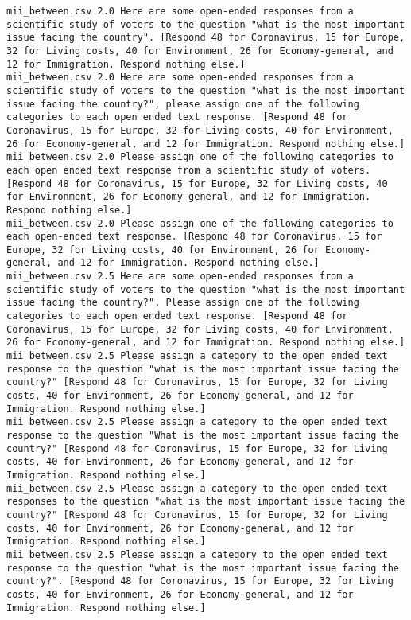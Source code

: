 \begin{lstlisting}[label=lst:promptvariants]
mii_between.csv	2.0	Here are some open-ended responses from a scientific study of voters to the question "what is the most important issue facing the country". [Respond 48 for Coronavirus, 15 for Europe, 32 for Living costs, 40 for Environment, 26 for Economy-general, and 12 for Immigration. Respond nothing else.]
mii_between.csv	2.0	Here are some open-ended responses from a scientific study of voters to the question "what is the most important issue facing the country?", please assign one of the following categories to each open ended text response. [Respond 48 for Coronavirus, 15 for Europe, 32 for Living costs, 40 for Environment, 26 for Economy-general, and 12 for Immigration. Respond nothing else.]
mii_between.csv	2.0	Please assign one of the following categories to each open ended text response from a scientific study of voters. [Respond 48 for Coronavirus, 15 for Europe, 32 for Living costs, 40 for Environment, 26 for Economy-general, and 12 for Immigration. Respond nothing else.]
mii_between.csv	2.0	Please assign one of the following categories to each open-ended text response. [Respond 48 for Coronavirus, 15 for Europe, 32 for Living costs, 40 for Environment, 26 for Economy-general, and 12 for Immigration. Respond nothing else.]
mii_between.csv	2.5	Here are some open-ended responses from a scientific study of voters to the question "what is the most important issue facing the country?". Please assign one of the following categories to each open ended text response. [Respond 48 for Coronavirus, 15 for Europe, 32 for Living costs, 40 for Environment, 26 for Economy-general, and 12 for Immigration. Respond nothing else.]
mii_between.csv	2.5	Please assign a category to the open ended text response to the question "what is the most important issue facing the country?" [Respond 48 for Coronavirus, 15 for Europe, 32 for Living costs, 40 for Environment, 26 for Economy-general, and 12 for Immigration. Respond nothing else.]
mii_between.csv	2.5	Please assign a category to the open ended text response to the question "What is the most important issue facing the country?" [Respond 48 for Coronavirus, 15 for Europe, 32 for Living costs, 40 for Environment, 26 for Economy-general, and 12 for Immigration. Respond nothing else.]
mii_between.csv	2.5	Please assign a category to the open ended text responses to the question "what is the most important issue facing the country?" [Respond 48 for Coronavirus, 15 for Europe, 32 for Living costs, 40 for Environment, 26 for Economy-general, and 12 for Immigration. Respond nothing else.]
mii_between.csv	2.5	Please assign a category to the open ended text response to the question "what is the most important issue facing the country?". [Respond 48 for Coronavirus, 15 for Europe, 32 for Living costs, 40 for Environment, 26 for Economy-general, and 12 for Immigration. Respond nothing else.]

\end{lstlisting}
